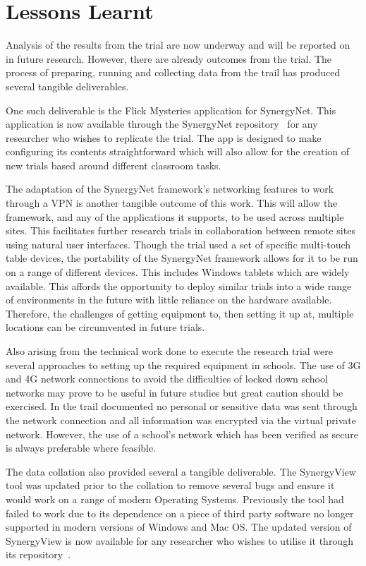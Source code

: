 \documentclass[a4paper,11pt]{article}
\begin{document}
\section{Lessons Learnt}

Analysis of the results from the trial are now underway and will be reported on in future research.
However, there are already outcomes from the trial.
The process of preparing, running and collecting data from the trail has produced several tangible deliverables.

One such deliverable is the Flick Mysteries application for SynergyNet.
This application is now available through the SynergyNet repository~\cite{hatch:2011} for any researcher who wishes to replicate the trial.
The app is designed to make configuring its contents straightforward which will also allow for the creation of new trials based around different classroom tasks.

The adaptation of the SynergyNet framework's networking features to work through a VPN is another tangible outcome of this work.
This will allow the framework, and any of the applications it supports, to be used across multiple sites.
This facilitates further research trials in collaboration between remote sites using natural user interfaces.
Though the trial used a set of specific multi-touch table devices, the portability of the SynergyNet framework allows for it to be run on a range of different devices.
This includes Windows tablets which are widely available.
This affords the opportunity to deploy similar trials into a wide range of environments in the future with little reliance on the hardware available.
Therefore, the challenges of getting equipment to, then setting it up at, multiple locations can be circumvented in future trials.

Also arising from the technical work done to execute the research trial were several approaches to setting up the required equipment in schools.
The use of 3G and 4G network connections to avoid the difficulties of locked down school networks may prove to be useful in future studies but great caution should be exercised.
In the trail documented no personal or sensitive data was sent through the network connection and all information was encrypted via the virtual private network.
However, the use of a school's network which has been verified as secure is always preferable where feasible.

The data collation also provided several a tangible deliverable.
The SynergyView tool was updated prior to the collation to remove several bugs and ensure it would work on a range of modern Operating Systems.
Previously the tool had failed to work due to its dependence on a piece of third party software no longer supported in modern versions of Windows and Mac OS.
The updated version of SynergyView is now available for any researcher who wishes to utilise it through its repository~\cite{kyaw:2010}.
\end{document}
